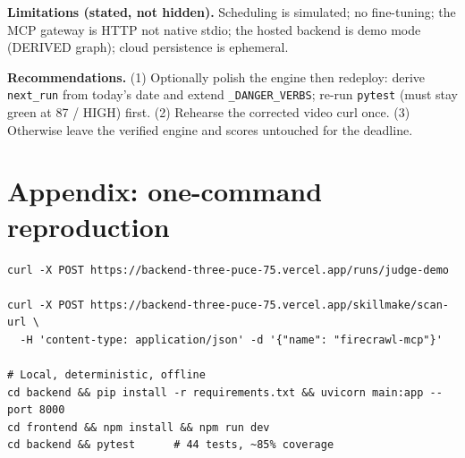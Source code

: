 \documentclass[11pt]{article}
\newcommand{\code}[1]{\lstinline[style=inlinecode]|#1|}
\begin{document}
\textbf{Limitations (stated, not hidden).} Scheduling is simulated; no fine-tuning; the MCP gateway is HTTP not native stdio; the hosted backend is demo mode (DERIVED graph); cloud persistence is ephemeral.

\textbf{Recommendations.} (1) Optionally polish the engine then redeploy: derive \code{next_run} from today's date and extend \code{_DANGER_VERBS}; re-run \code{pytest} (must stay green at 87 / HIGH) first. (2) Rehearse the corrected video curl once. (3) Otherwise leave the verified engine and scores untouched for the deadline.

\section*{Appendix: one-command reproduction}
\begin{lstlisting}
curl -X POST https://backend-three-puce-75.vercel.app/runs/judge-demo

curl -X POST https://backend-three-puce-75.vercel.app/skillmake/scan-url \
  -H 'content-type: application/json' -d '{"name": "firecrawl-mcp"}'

# Local, deterministic, offline
cd backend && pip install -r requirements.txt && uvicorn main:app --port 8000
cd frontend && npm install && npm run dev
cd backend && pytest      # 44 tests, ~85% coverage
\end{lstlisting}
\end{document}
